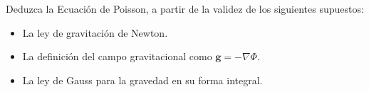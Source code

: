 
\question[1] 
  Deduzca la Ecuación de Poisson, a partir de la validez de los siguientes supuestos:
  \begin{itemize}
    \item La ley de gravitación de Newton.
    \item La definición del campo gravitacional como \( \mathbf{g} = -\nabla \Phi \).
    \item La ley de Gauss para la gravedad en su forma integral.
  \end{itemize}

\droptotalpoints


